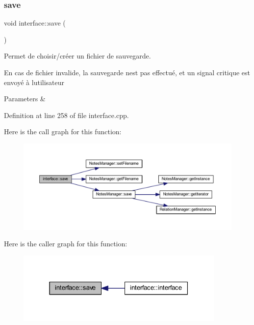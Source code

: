 \subsubsection{\texorpdfstring{save}{save}}
{\footnotesize\ttfamily void interface\+::save (\begin{DoxyParamCaption}{ }\end{DoxyParamCaption})\hspace{0.3cm}{\ttfamily [slot]}}



Permet de choisir/créer un fichier de sauvegarde. 

En cas de fichier invalide, la sauvegarde n\textquotesingle{}est pas effectué, et un signal critique est envoyé à l\textquotesingle{}utilisateur 
\begin{DoxyParams}{Parameters}
{\em } & \\
\hline
\end{DoxyParams}


Definition at line 258 of file interface.\+cpp.

Here is the call graph for this function\+:\nopagebreak
\begin{figure}[H]
\begin{center}
\leavevmode
\includegraphics[width=350pt]{classinterface_a319f133949e2be97a203f725c3f1e565_cgraph}
\end{center}
\end{figure}
Here is the caller graph for this function\+:\nopagebreak
\begin{figure}[H]
\begin{center}
\leavevmode
\includegraphics[width=291pt]{classinterface_a319f133949e2be97a203f725c3f1e565_icgraph}
\end{center}
\end{figure}
\mbox{\label{classinterface_aca23c755ba40ca8198010ff0487b22a8}} 

